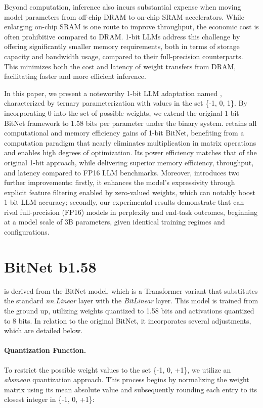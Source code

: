 Beyond computation, inference also incurs substantial expense when moving model parameters from off-chip DRAM to on-chip SRAM accelerators. While enlarging on-chip SRAM is one route to improve throughput, the economic cost is often prohibitive compared to DRAM. 1-bit LLMs address this challenge by offering significantly smaller memory requirements, both in terms of storage capacity and bandwidth usage, compared to their full-precision counterparts. This minimizes both the cost and latency of weight transfers from DRAM, facilitating faster and more efficient inference.

In this paper, we present a noteworthy 1-bit LLM adaptation named \textbf{}, characterized by ternary parameterization with values in the set \{-1, 0, 1\}. By incorporating 0 into the set of possible weights, we extend the original 1-bit BitNet framework to 1.58 bits per parameter under the binary system.  retains all computational and memory efficiency gains of 1-bit BitNet, benefiting from a computation paradigm that nearly eliminates multiplication in matrix operations and enables high degrees of optimization. Its power efficiency matches that of the original 1-bit approach, while delivering superior memory efficiency, throughput, and latency compared to FP16 LLM benchmarks. Moreover,  introduces two further improvements: firstly, it enhances the model's expressivity through explicit feature filtering enabled by zero-valued weights, which can notably boost 1-bit LLM accuracy; secondly, our experimental results demonstrate that  can rival full-precision (FP16) models in perplexity and end-task outcomes, beginning at a model scale of 3B parameters, given identical training regimes and configurations.

\section{BitNet b1.58}

 is derived from the BitNet model, which is a Transformer variant that substitutes the standard \emph{nn.Linear} layer with the \emph{BitLinear} layer. This model is trained from the ground up, utilizing weights quantized to 1.58 bits and activations quantized to 8 bits. In relation to the original BitNet, it incorporates several adjustments, which are detailed below.

\paragraph{Quantization Function.} To restrict the possible weight values to the set \{-1, 0, +1\}, we utilize an \emph{absmean} quantization approach. This process begins by normalizing the weight matrix using its mean absolute value and subsequently rounding each entry to its closest integer in \{-1, 0, +1\}:

